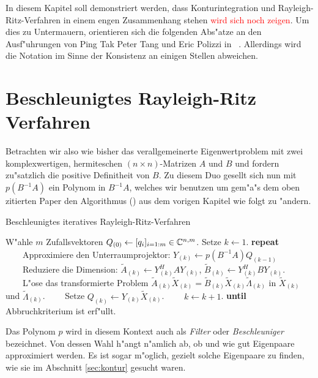 In diesem Kapitel soll demonstriert werden, dass Konturintegration und
Rayleigh-Ritz-Verfahren in einem engen Zusammenhang stehen \textcolor{red}{wird sich noch zeigen}.
Um dies zu Untermauern, orientieren sich die folgenden Abs"atze an den Ausf"uhrungen
von Ping Tak Peter Tang und Eric Polizzi in ~\cite{ptep}. Allerdings wird
die Notation im Sinne der Konsistenz an einigen Stellen abweichen.

\section{Beschleunigtes Rayleigh-Ritz Verfahren}\label{chap3:beschrr}

Betrachten wir also wie bisher das verallgemeinerte Eigenwertproblem mit zwei
komplexwertigen, hermiteschen $(n\times n)$-Matrizen $A$ und $B$ und fordern
zu"satzlich die positive Definitheit von $B$. Zu diesem Duo gesellt sich nun
mit $p(B^{-1}A)$ ein Polynom in $B^{-1}A$, welches wir benutzen um gem"a"s dem
oben zitierten Paper den Algorithmus () aus dem vorigen Kapitel wie folgt zu "andern.

\begin{algorithm}\label{alg:beschlrr}
\caption{Beschleunigtes iteratives Rayleigh-Ritz-Verfahren}\label{euclid}
\begin{algorithmic}[1]
\State W"ahle $m$ Zufallsvektoren $Q_{(0)} \gets [q_i]_{i=1:m} \in\mathbb{C}^{n,m}$.
Setze $k \gets 1$.
\State \textbf{repeat}
\State \ \ \ \ Approximiere den Unterraumprojektor: $Y_{(k)} \gets p(B^{-1}A)Q_{(k-1)}$
\State \ \ \ \ Reduziere die Dimension: $\widetilde{A}_{(k)} \gets Y_{(k)}^H A Y_{(k)}$,
$\widetilde{B}_{(k)} \gets Y_{(k)}^H B Y_{(k)}$.
\State \ \ \ \ L"ose das transformierte Problem $\widetilde{A}_{(k)}\widetilde{X}_{(k)}
= \widetilde{B}_{(k)}\widetilde{X}_{(k)}\widetilde{\Lambda}_{(k)}$ in
$\widetilde{X}_{(k)}$ und $\widetilde{\Lambda}_{(k)}$.
\State \ \ \ \ Setze $Q_{(k)} \gets Y_{(k)}\widetilde{X}_{(k)}$.
\State \ \ \ \ $k \gets k+1$.
\State \textbf{until} Abbruchkriterium ist erf"ullt.
\end{algorithmic}
\end{algorithm}

Das Polynom $p$ wird in diesem Kontext auch als \emph{Filter} oder \emph{Beschleuniger}
bezeichnet. Von dessen Wahl h"angt n"amlich ab, ob und wie gut Eigenpaare approximiert
werden. Es ist sogar m"oglich, gezielt solche Eigenpaare zu finden, wie sie im
Abschnitt \ref{sec:kontur} gesucht waren.\\

